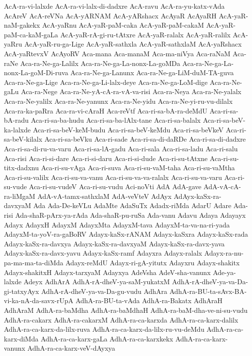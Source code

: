 {AcA-ra-vi-lalxde
AcA-ra-vi-lalx-di-dadxre
AcA-ravu
AcA-ra-yu-katx-vAda
AcAreV
AcA-reVNa
AcA-yARNAM
AcA-yARshacx
AcAyaR
AcAyaRH
AcA-yaR-naM-gakekx
AcA-yaRnu
AcA-yaR-paM-caka
AcA-yaR-paM-cakaM
AcA-yaR-paM-ca-kaM-gaLa
AcA-yaR-rA-gi-ru-tAtxre
AcA-yaR-ralalx
AcA-yaR-ralilx
AcA-yaRru
AcA-yaR-ru-ga-Lige
AcA-yaR-sathxla
AcA-yaR-sathxlaM
AcA-yaRshacx
AcA-yaRtevxV
AcAyoRV
Aca-mana
Aca-manaM
Aca-ma-niVya
Aca-raNaM
Aca-raNe
Aca-ra-Ne-ga-Lalilx
Aca-ra-Ne-ga-La-nonx-La-goMDa
Aca-ra-Ne-ga-La-nonx-La-goM-Di-ruva
Aca-ra-Ne-ga-Lanunx
Aca-ra-Ne-ga-LiM-duM-TA-guva
Aca-ra-Ne-ga-Lige
Aca-ra-Ne-ga-Li-lalx-deye
Aca-ra-Ne-ga-LoM-dige
Aca-ra-Ne-gaLu
Aca-ra-Nege
Aca-ra-Ne-yA-cA-ra-vA-va-risi
Aca-ra-Neya
Aca-ra-Ne-yalalx
Aca-ra-Ne-yalilx
Aca-ra-Ne-yanunx
Aca-ra-Ne-yidu
Aca-ra-Ne-yi-ru-vu-dilalx
Aca-ra-ka-paRra
Aca-ra-vi-cAraH
Aca-reVtf
Aca-ri-sa-bA-ra-deMdU
Aca-ri-sa-bA-radu
Aca-ri-sa-ba-hudu
Aca-ri-sa-ba-lAlx-tane
Aca-ri-sa-balalx
Aca-ri-sa-beV-ka-lalxde
Aca-ri-sa-beV-keM-budu
Aca-ri-sa-beV-keMdu
Aca-ri-sa-beVkeV
Aca-ri-sa-beV-kilalx
Aca-ri-sa-beVku
Aca-ri-sade
Aca-ri-sa-di-daRDe
Aca-ri-sa-di-dadxre
Aca-ri-sa-di-ru-va-varu
Aca-ri-sa-lA-gadu
Aca-ri-sala
Aca-ri-sa-ladu
Aca-ri-salu
Aca-risi
Aca-ri-si-dare
Aca-ri-si-daru
Aca-ri-si-dude
Aca-ri-su-tAtxne
Aca-ri-su-titx-dadxnu
Aca-ri-su-vAga
Aca-ri-suva
Aca-ri-su-vaM-taha
Aca-ri-su-vaMtha
Aca-ri-su-valilx
Aca-ri-su-va-vanu
Aca-ri-su-va-va-ralalx
Aca-ri-su-va-varu
Aca-ri-su-vude
Aca-ri-su-vudeV
Aca-ri-su-vudu
Aci-noVti
AdA
AdA-gave
AdA-vA-cA-ra-liMgaM
AdA-vA-tamx-sathxlaM
AdA-veVteV
AdAyx
AdAyx-kaSx-ra-davxyaM
Ada
Ada-De-keVLu
AdaMte
AdaSuTx
Adadx-riMda
AdarU
Adare
Ada-risi
Ada-shaR-pArx-ya-rAda
Ada-shaR-pu-ruSa
Ada-vanu
Adavu
Adaya
Adayayx
Adayx
AdayxH
AdayxM
AdayxMta
AdayxM-tava
AdayxM-ta-va-na-ri-yada
AdayxM-ta-yoV-ra-gaBoRV
Adayx-kaSx-rANAM
Adayx-kaSxra
Adayx-kaSx-rada
Adayx-kaSx-ra-davxya
Adayx-kaSx-ra-davxyaM
Adayx-kaSx-ra-davx-yava
Adayx-kaSx-ra-davx-yavu
Adayx-kaSx-ramf
Adayxra
Adayx-ralalx
Adayx-ra-nu-pa-ma-ma-ta-diMda
Adayx-reMdU
Adayx-ri-gA-yitutx
Adayxru
Adayx-shakitx
Adayx-shakitxH
Adayx-tarxyaM
Adayxya
AdeVsha
AdeV-sha-vanunx
Ade-ya-lalxde
Adeyx
AdhArA
AdhA-rA-dheV-ya-saM-yukatxM
AdhA-rA-dheV-ya-va-Da-gi-tatxyAyx
AdhA-rA-dheV-ya-va-Da-gu-vudu
AdhAra
AdhA-ra-BU-ta-sAvx-BA-vi-ka-nA-da-savx-rUpA
AdhA-ra-BU-ta-vAda
AdhA-ra-Bakatx
AdhAraH
AdhAraM
AdhA-ra-baMdha
AdhA-ra-baMdhaH
AdhA-ra-baM-dha-ve-ni-su-vudu
AdhA-ra-cakarx
AdhA-ra-cakarxM
AdhA-ra-ca-karxda
AdhA-ra-ca-karx-dalilx
AdhA-ra-ca-karx-da-lilx-ruva
AdhA-ra-ca-karx-da-lilx-ru-vu-deMdu
AdhA-ra-ca-karx-diMda
AdhA-ra-ca-karx-gaLa
AdhA-ra-ca-karxkekx
AdhA-ra-ca-karx-vanunx
AdhA-ra-ca-karx-veV-dAyxya
}

